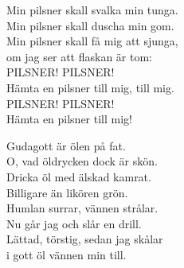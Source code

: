 \documentclass[a6paper, 10pt, twoside]{article}
\begin{document}
\begin{center}
\end{center}
\begin{lyrics}
Min pilsner skall svalka min tunga. \\
Min pilsner skall duscha min gom. \\
Min pilsner skall få mig att sjunga, \\
om jag ser att flaskan är tom: \\
\newline
PILSNER! PILSNER! \\
Hämta en pilsner till mig, till mig. \\
PILSNER! PILSNER! \\
Hämta en pilsner till mig!
\end{lyrics}
\vspace{40pt}
\begin{center}
\end{center}
\begin{lyrics}
Gudagott är ölen på fat. \\
O, vad öldrycken dock är skön. \\
Dricka öl med älskad kamrat. \\
Billigare än likören grön. \\
Humlan surrar, vännen strålar. \\
Nu går jag och slår en drill. \\
Lättad, törstig, sedan jag skålar \\
i gott öl vännen min till. 
\end{lyrics}
\end{document}
